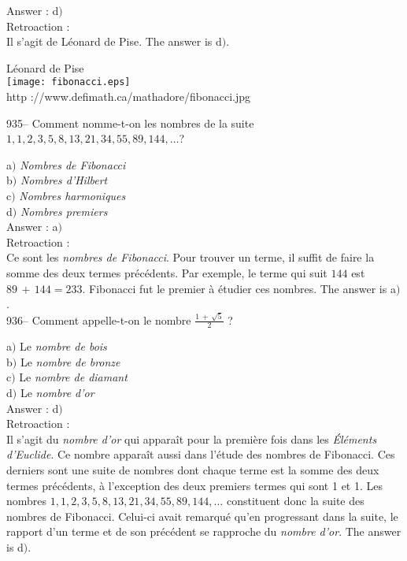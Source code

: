 ﻿\documentclass[letterpaper, 12pt]{article}
\begin{document}
Answer : d$)$\\

Retroaction : \\
Il s'agit de L\'eonard de Pise. The answer is d$)$.

        \begin{center}
        L\'eonard de Pise\\
    \texttt{[image: fibonacci.eps]}\\
        {\footnotesize http ://www.defimath.ca/mathadore/fibonacci.jpg}
    \end{center}

935-- Comment nomme-t-on les nombres de la suite
$1,1,2,3,5,8,13,21,34,55,89,144, \ldots$?

a$)$ {\sl Nombres de Fibonacci} \\
b$)$ {\sl Nombres d'Hilbert} \\
c$)$ {\sl Nombres harmoniques} \\
d$)$ {\sl Nombres premiers}\\

Answer : a$)$\\

Retroaction : \\
Ce sont les {\sl nombres de Fibonacci}. Pour trouver un terme, il
suffit de faire la somme des deux termes pr\'ec\'edents. Par
exemple, le terme qui suit $144$ est $89\,+\,144=233$. Fibonacci fut
le premier \`a
\'etudier ces nombres. The answer is a$)$.\\

936-- Comment appelle-t-on le nombre $\frac{1\,+\,\sqrt5}2$ ?

a$)$ Le {\sl nombre de bois} \\
b$)$ Le {\sl nombre de bronze} \\
c$)$ Le {\sl nombre de diamant} \\
d$)$ Le {\sl nombre d'or}\\

Answer : d$)$\\

Retroaction : \\
Il s'agit du {\sl nombre d'or} qui appara\^it pour la premi\`ere
fois dans les {\sl \'El\'ements d'Euclide}. Ce nombre appara\^it
aussi dans l'\'etude des nombres de Fibonacci. Ces derniers sont une
suite de nombres dont chaque terme est la somme des deux termes
pr\'ec\'edents,  \`a l'exception des deux premiers termes qui sont 1
et 1. Les nombres $1,1,2,3,5,8,13,21,34,55,89,144, \ldots$
constituent donc la suite des nombres de Fibonacci. Celui-ci avait
remarqu\'e qu'en progressant dans la suite, le rapport d'un terme et
de son pr\'ec\'edent
se rapproche du {\sl nombre d'or}. The answer is d$)$.\\
\end{document}
